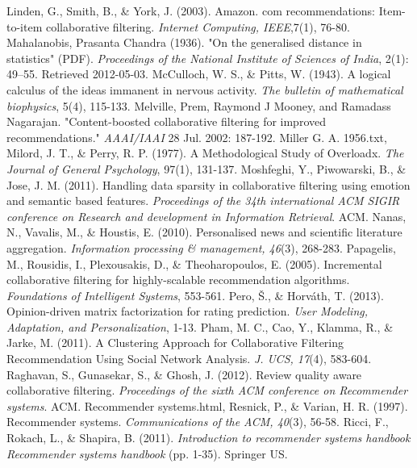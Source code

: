 \documentclass[12pt]{article}
\begin{document}
\begin{thebibliography}{100}
 Linden, G., Smith, B., \& York, J. (2003). Amazon. com recommendations: Item-to-item collaborative filtering. \textit{Internet Computing, IEEE},7(1), 76-80.
 Mahalanobis, Prasanta Chandra (1936). "On the generalised distance in statistics" (PDF). \textit{Proceedings of the National Institute of Sciences of India}, 2(1): 49–55. Retrieved 2012-05-03.
 McCulloch, W. S., \& Pitts, W. (1943). A logical calculus of the ideas immanent in nervous activity. \textit{The bulletin of mathematical biophysics}, 5(4), 115-133.
 Melville, Prem, Raymond J Mooney, and Ramadass Nagarajan. "Content-boosted collaborative filtering for improved recommendations." \textit{AAAI/IAAI} 28 Jul. 2002: 187-192.
 Miller G. A. 1956.txt,
 Milord, J. T., \& Perry, R. P. (1977). A Methodological Study of Overloadx. \textit{The Journal of General Psychology}, 97(1), 131-137.
 Moshfeghi, Y., Piwowarski, B., \& Jose, J. M. (2011). Handling data sparsity in collaborative filtering using emotion and semantic based features. \textit{Proceedings of the 34th international ACM SIGIR conference on Research and development in Information Retrieval}. ACM.
 Nanas, N., Vavalis, M., \& Houstis, E. (2010). Personalised news and scientific literature aggregation. \textit{Information processing \& management, 46}(3), 268-283.
 Papagelis, M., Rousidis, I., Plexousakis, D., \& Theoharopoulos, E. (2005). Incremental collaborative filtering for highly-scalable recommendation algorithms. \textit{Foundations of Intelligent Systems}, 553-561.
 Pero, Š., \& Horváth, T. (2013). Opinion-driven matrix factorization for rating prediction. \textit{User Modeling, Adaptation, and Personalization}, 1-13.
 Pham, M. C., Cao, Y., Klamma, R., \& Jarke, M. (2011). A Clustering Approach for Collaborative Filtering Recommendation Using Social Network Analysis. \textit{J. UCS, 17}(4), 583-604.
 Raghavan, S., Gunasekar, S., \& Ghosh, J. (2012). Review quality aware collaborative filtering. \textit{Proceedings of the sixth ACM conference on Recommender systems}. ACM.
 Recommender systems.html,
 Resnick, P., \& Varian, H. R. (1997). Recommender systems. \textit{Communications of the ACM, 40}(3), 56-58.
 Ricci, F., Rokach, L., \& Shapira, B. (2011). \textit{Introduction to recommender systems handbook Recommender systems handbook} (pp. 1-35). Springer US.

\end{thebibliography}
\end{document}
